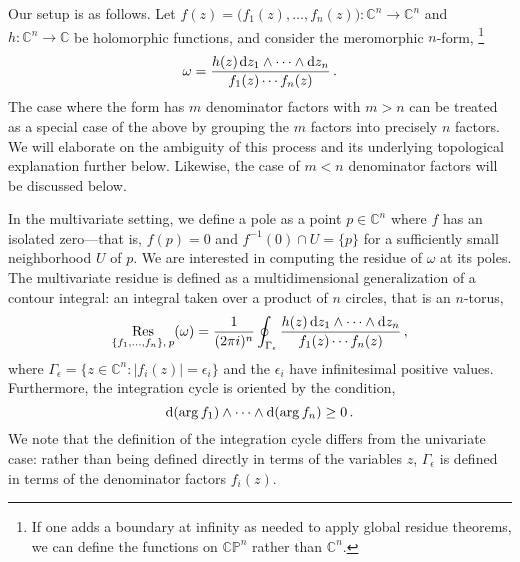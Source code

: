 \documentclass[dvipsnames,preprint,12pt,sort&compress]{elsarticle}
\def\d{{\rm d}}
\begin{document}
Our setup is as follows. Let $f(z) = \big(f_1(z), \ldots, f_n(z) \big) : \mathbb{C}^n \to \mathbb{C}^n$
and $h : \mathbb{C}^n \to \mathbb{C}$ be holomorphic functions, and
consider the meromorphic $n$-form,%
\footnote{If one adds a boundary at infinity as needed to apply
global residue theorems, we can define the functions on $\mathbb{CP}^n$
rather than $\mathbb{C}^n$.}
\begin{align}
\omega = \frac{h(z) \hspace{0.4mm} \d z_1\wedge\cdots\wedge \d z_n}{f_1(z)\cdots f_n(z)}\,.
\label{eq:diff_form_generic}
\end{align}
The case where the form has $m$ denominator factors with $m>n$ can be treated as a special
case of the above by grouping the $m$ factors into precisely $n$ factors.
We will elaborate on the ambiguity of this process and its underlying
topological explanation further below. Likewise, the case of
$m < n$ denominator factors will be discussed below.

In the multivariate setting, we define a pole as a point $p \in \mathbb{C}^n$
where $f$ has an isolated zero---that is, $f(p) = 0$ and $f^{-1}(0)\cap U = \{p\}$ for
a sufficiently small neighborhood $U$ of $p$.
We are interested in computing the residue of $\omega$ at its poles.
The multivariate residue is defined as a multidimensional generalization
of a contour integral: an integral taken over a product of $n$ circles,
that is an $n$-torus,
\begin{align}
\mathop{\mathrm{Res}}_{\{f_1,\dots,f_n\}, \hspace{0.6mm} p}(\omega) =
\frac{1}{(2\pi i)^n}
\oint_{\Gamma_\epsilon}
\frac{h(z) \hspace{0.6mm} \d z_1\wedge\cdots\wedge \d z_n}{f_1(z)\cdots f_n(z)}\,,
\label{eq:residue_def}
\end{align}
where $\Gamma_\epsilon = \{z\in \mathbb{C}^n:|f_i(z)| = \epsilon_i\}$ and the $\epsilon_i$
have infinitesimal positive values. Furthermore, the integration cycle is oriented by
the condition,
\begin{equation}
\d (\mathrm{arg} \hspace{0.6mm} f_1) \wedge \cdots \wedge \d (\mathrm{arg} \hspace{0.6mm} f_n) \geq 0 \,.
\label{eq:orientation_of_cycle}
\end{equation}
We note that the definition of the integration cycle differs from the univariate case:
rather than being defined directly in terms of the variables $z$, $\Gamma_\epsilon$ is
defined in terms of the denominator factors $f_i(z)$.
\end{document}
